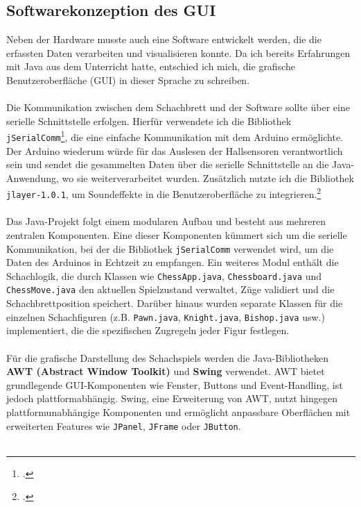 \documentclass[a4paper]{article}
\begin{document}
\subsection{Softwarekonzeption des GUI}
Neben der Hardware musste auch eine Software entwickelt werden, die die erfassten Daten verarbeiten und visualisieren konnte. Da ich bereits Erfahrungen mit Java aus dem Unterricht hatte, entschied ich mich, die grafische Benutzeroberfläche (GUI) in dieser Sprache zu schreiben.\\
\\
Die Kommunikation zwischen dem Schachbrett und der Software sollte über eine serielle Schnittstelle erfolgen. Hierfür verwendete ich die Bibliothek \texttt{jSerialComm}\footcite{arduino_forum_java_serial}, die eine einfache Kommunikation mit dem Arduino ermöglichte. Der Arduino wiederum würde für das Auslesen der Hallsensoren verantwortlich sein und sendet die gesammelten Daten über die serielle Schnittstelle an die Java-Anwendung, wo sie weiterverarbeitet wurden. Zusätzlich nutzte ich die Bibliothek \texttt{jlayer-1.0.1}, um Soundeffekte in die Benutzeroberfläche zu integrieren.\footcite{youtube_Jlayer}\\
\\
Das Java-Projekt folgt einem modularen Aufbau und besteht aus mehreren zentralen Komponenten. Eine dieser Komponenten kümmert sich um die serielle Kommunikation, bei der die Bibliothek \texttt{jSerialComm} verwendet wird, um die Daten des Arduinos in Echtzeit zu empfangen. Ein weiteres Modul enthält die Schachlogik, die durch Klassen wie \texttt{ChessApp.java}, \texttt{Chessboard.java} und \texttt{ChessMove.java} den aktuellen Spielzustand verwaltet, Züge validiert und die Schachbrettposition speichert. Darüber hinaus wurden separate Klassen für die einzelnen Schachfiguren (z.B. \texttt{Pawn.java}, \texttt{Knight.java}, \texttt{Bishop.java} usw.) implementiert, die die spezifischen Zugregeln jeder Figur festlegen.\\
\\
Für die grafische Darstellung des Schachspiels werden die Java-Bibliotheken \textbf{AWT (Abstract Window Toolkit)} und \textbf{Swing} verwendet. AWT bietet grundlegende GUI-Komponenten wie Fenster, Buttons und Event-Handling, ist jedoch plattformabhängig. Swing, eine Erweiterung von AWT, nutzt hingegen plattformunabhängige Komponenten und ermöglicht anpassbare Oberflächen mit erweiterten Features wie \texttt{JPanel}, \texttt{JFrame} oder \texttt{JButton}. \\
\\
\end{document}
